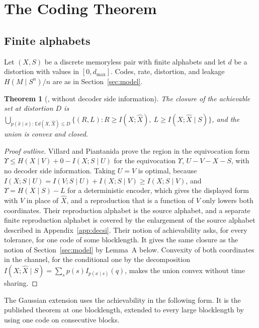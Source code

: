 \documentclass[11pt,onecolumn]{IEEEtran}
\newtheorem{theorem}{Theorem}
\newcommand{\E}{\mathbb{E}}
\newcommand{\hX}{\widehat{X}}
\begin{document}
\appendices

\section{The Coding Theorem}
\label{app:coding}

\subsection{Finite alphabets}

Let $(X,S)$ be a discrete memoryless pair with finite alphabets and let
$d$ be a distortion with values in $[0,d_{\max}]$. Codes, rate,
distortion, and leakage $H(M\mid S^n)/n$ are as in Section~\ref{sec:model}.

\begin{theorem}[{\cite[Theorem~3]{villard2013}, without decoder side information}]
\label{thm:dmc}
The closure of the achievable set at distortion $D$ is
$\bigcup_{p(\hat x\mid x):\,\E d(X,\hX)\le D}\{(R,L):R\ge I(X;\hX),\ L\ge I(X;\hX\mid S)\}$,
and the union is convex and closed.
\end{theorem}

\begin{proof}[Proof outline]
Villard and Piantanida prove the region in the equivocation form
$\Upsilon\le H(X\mid V)+0-I(X;S\mid U)$ for the equivocation $\Upsilon$, $U-V-X-S$, with no decoder side
information. Taking $U=V$ is optimal, because
$I(X;S\mid U)=I(V;S\mid U)+I(X;S\mid V)\ge I(X;S\mid V)$, and
$\Upsilon=H(X\mid S)-L$ for a deterministic encoder, which gives the
displayed form with $V$ in place of $\hX$, and a reproduction that is a
function of $V$ only lowers both coordinates. Their reproduction
alphabet is the source alphabet, and a separate finite reproduction
alphabet is covered by the enlargement of the source alphabet described
in Appendix~\ref{app:decsi}. Their notion of achievability asks, for
every tolerance, for one code of some blocklength. It gives the same
closure as the notion of Section~\ref{sec:model} by
Lemma~A below.
Convexity of both coordinates in the channel, for the conditional one by
the decomposition $I(X;\hX\mid S)=\sum_sp(s)I_{p(x\mid s)}(q)$, makes the
union convex without time sharing.
\end{proof}

The Gaussian extension uses the achievability in the following form.
It is the published theorem at one blocklength, extended to every large
blocklength by using one code on consecutive blocks.
\end{document}
